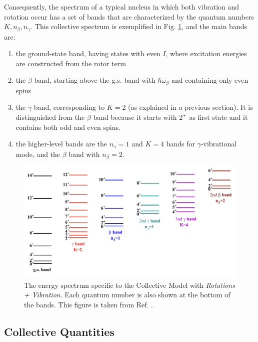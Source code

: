 Consequently, the spectrum of a typical nucleus in which both vibration and rotation occur has a set of bands that are characterized by the quantum numbers $K,n_\beta,n_\gamma$. This collective spectrum is exemplified in Fig. \ref{collective-rotation-vibration-energy-levels}, and the main bands are:
\begin{enumerate}
    \item the ground-state band, having states with even $I$, where excitation energies are constructed from the rotor term
    \item the $\beta$ band, starting above the g.s. band with $\hbar\omega_\beta$ and containing only even spins
    \item the $\gamma$ band, corresponding to $K=2$ (as explained in a previous section). It is distinguished from the $\beta$ band because it starts with $2^+$ as first state and it contains both odd and even spins.
    \item the higher-level bands are the $n_\gamma=1$ and $K=4$ bands for $\gamma$-vibrational mode, and the $\beta$ band with $n_\beta=2$.
\end{enumerate}
\begin{figure}
    \centering
    \includegraphics[width=0.99\textwidth]{Chapters/Figures/types_collective_bands.pdf}
    \caption{The energy spectrum specific to the Collective Model with \emph{Rotations + Vibration}. Each quantum number is also shown at the bottom of the bands. This figure is taken from Ref. \cite{li2022model}.}
    \label{collective-rotation-vibration-energy-levels}
\end{figure}

\subsection{Collective Quantities}
\label{c3-collective-quantities}

